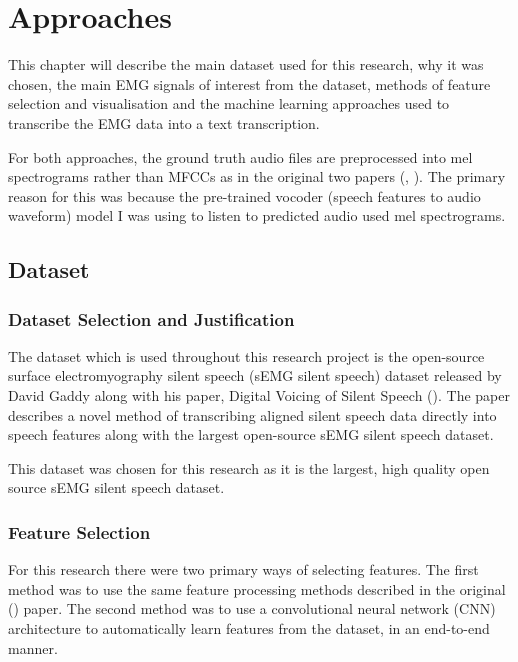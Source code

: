 \chapter{Approaches} \label{chap:approaches}

This chapter will describe the main dataset used for this research, why it was chosen,
the main EMG signals of interest from the dataset, methods of feature selection and
visualisation and the machine learning approaches used to transcribe the EMG data
into a text transcription.

For both approaches, the ground truth audio files
are preprocessed into mel spectrograms rather than MFCCs as in the original two papers
(\cite{gaddy2020digital}, \cite{gaddy2021improved}). The primary reason for this
was because the pre-trained vocoder (speech features to audio waveform) model
I was using to listen to predicted audio used mel spectrograms.



\iffalse

\fi



\iffalse

\section{Dataset}

\subsection{Dataset Selection and Justification}

The dataset which is used throughout this research project is the open-source
surface electromyography silent speech (sEMG silent speech) dataset released
by David Gaddy along with his paper, Digital Voicing of Silent Speech
(\cite{gaddy2020digital}).
The paper describes a novel method of transcribing aligned silent speech data
directly into speech features along with the largest open-source sEMG silent
speech dataset.

This dataset was chosen for this research as it is the largest, high quality open
source sEMG silent speech dataset.

\subsection{Feature Selection}

For this research there were two primary ways of selecting features. The first method
was to use the same feature processing methods described in the original
(\cite{gaddy2020digital}) paper. The second method was to use a convolutional
neural network (CNN) architecture to automatically learn features from the
dataset, in an end-to-end manner.

